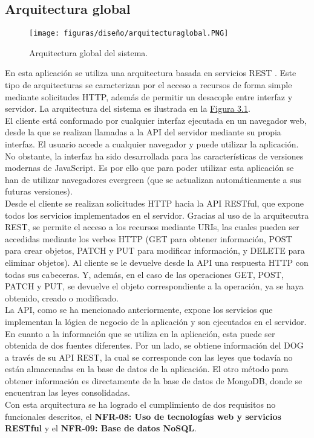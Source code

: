 \subsection{Arquitectura global}

\begin{figure}[H]
\centerline{\texttt{[image: figuras/diseño/arquitecturaglobal.PNG]}}
\caption{Arquitectura global del sistema.}
\label{enlaceArquitecturaGlobal}
\end{figure}

En esta aplicación se utiliza una arquitectura basada en servicios REST \cite{rest}. Este tipo de arquitecturas se caracterizan por el acceso a recursos de forma simple mediante solicitudes HTTP, además de permitir un desacople entre interfaz y servidor. La arquitectura del sistema es ilustrada en la \hyperref[enlaceArquitecturaGlobal]{Figura 3.1}.
\\

El cliente está conformado por cualquier interfaz ejecutada en un navegador web, desde la que se realizan llamadas a la API del servidor mediante su propia interfaz. El usuario accede a cualquier navegador y puede utilizar la aplicación. No obstante, la interfaz ha sido desarrollada para las características de versiones modernas de JavaScript. Es por ello que para poder utilizar esta aplicación se han de utilizar navegadores evergreen \cite{evergreen} (que se actualizan automáticamente a sus futuras versiones).
\\

Desde el cliente se realizan solicitudes HTTP hacia la API RESTful, que expone todos los servicios implementados en el servidor. Gracias al uso de la arquitecutra REST, se permite el acceso a los recursos mediante URIs, las cuales pueden ser accedidas mediante los verbos HTTP (GET para obtener información, POST para crear objetos, PATCH y PUT para modificar información, y DELETE para eliminar objetos). Al cliente se le devuelve desde la API una respuesta HTTP con todas sus cabeceras. Y, además, en el caso de las operaciones GET, POST, PATCH y PUT, se devuelve el objeto correspondiente a la operación, ya se haya obtenido, creado o modificado.
\\

La API, como se ha mencionado anteriormente, expone los servicios que implementan la lógica de negocio de la aplicación \cite{logicanegocio} y son ejecutados en el servidor.
\\

En cuanto a la información que se utiliza en la aplicación, esta puede ser obtenida de dos fuentes diferentes. Por un lado, se obtiene información del DOG a través de su API REST, la cual se corresponde con las leyes que todavía no están almacenadas en la base de datos de la aplicación. El otro método para obtener información es directamente de la base de datos de MongoDB, donde se encuentran las leyes consolidadas.
\\

Con esta arquitectura se ha logrado el cumplimiento de dos requisitos no funcionales descritos, el {\bf NFR-08: Uso de tecnologías web y servicios RESTful} y el {\bf NFR-09: Base de datos NoSQL}.